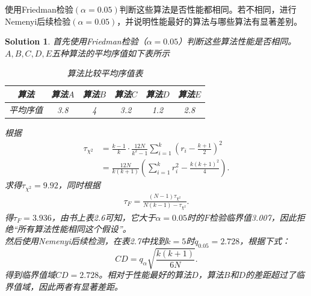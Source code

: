 \documentclass[a4paper,UTF8]{article}
\numberwithin{equation}{section}
\newtheorem*{mySol}{Solution}
\begin{document}
使用Friedman检验$(\alpha=0.05)$判断这些算法是否性能都相同。若不相同，进行Nemenyi后续检验$(\alpha=0.05)$，并说明性能最好的算法与哪些算法有显著差别。
\begin{mySol}
首先使用Friedman检验（$\alpha = 0.05$）判断这些算法性能是否相同。\\
$A,B,C,D,E$五种算法的平均序值如下表所示

\begin{table}[h]
\centering
\caption{算法比较平均序值表} \vspace{2mm}
\label{table:ranking}
\begin{tabular}{c|c c c c c}\hline
算法 		& 算法$A$  	&算法$B$  	& 算法$C$ 	& 算法$D$  	&算法$E$ 	\\ \hline
平均序值 		& 3.8 		&  4  		& 3.2  		&  1.2 		& 2.8	 \\ \hline
\end{tabular}
\end{table}
根据
\begin{align*}
 \tau_{\chi^2} 	& = \frac{k-1}{k} \cdot \frac{12N}{k^2-1} \sum_{i=1}^{k}(r_i - \frac{k+1}{2})^2 \\
			& = \frac{12N}{k(k+1)} \left ( \sum_{i=1}^{k}r_i^2 - \frac{k(k+1)^2}{4} \right ).
\end{align*}
求得$\tau_{\chi^2}=9.92$，同时根据
\begin{align*}
 \tau_F = \frac{(N-1)\tau_{\chi^2}}{N(k-1)-\tau_{\chi^2}}.
 \end{align*}
 得$ \tau_F = 3.936$，由书上表2.6可知，它大于$\alpha = 0.05$时的$F$检验临界值3.007，因此拒绝“所有算法性能相同这个假设”。\\
然后使用Nemenyi后续检测，在表2.7中找到$k=5$时$q_{0.05}=2.728$，根据下式：
\[ CD = q_\alpha \sqrt{\frac{k(k+1)}{6N}}.
\]
 得到临界值域$CD = 2.728$。相对于性能最好的算法$D$，算法$B$和$D$的差距超过了临界值域，因此两者有显著差距。
\end{mySol}

\newpage
\end{document}

